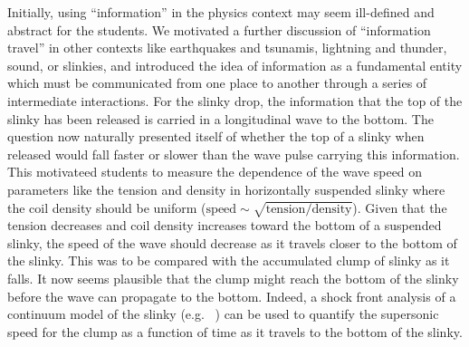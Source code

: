 \documentclass[pre,preprint,superscriptaddress,longbibliography]{revtex4-1}
\newcommand{\eq}[1]{eq.~\eqref{eq:#1}}
\begin{document}
Initially, using ``information'' in the physics context may seem ill-defined and abstract for the students.
We motivated a further discussion of ``information travel'' in other contexts like earthquakes and tsunamis, 
lightning and thunder, sound, or slinkies,
and introduced the idea of information as a fundamental entity which must be
communicated from one place to another through a series of intermediate interactions.
For the slinky drop, the information that the top of the slinky has been released is carried in a longitudinal wave to the bottom. 
The question now naturally presented itself of whether the top of a slinky when released would fall faster or slower than the wave pulse carrying this information. This motivateed students to measure the dependence of the wave speed on parameters like the tension and density in horizontally suspended slinky where the coil density should be uniform ($\mathrm{speed}\sim\sqrt{\mathrm{tension}/\mathrm{density}}$).
Given that the tension decreases and coil density increases toward the bottom of a suspended slinky, the speed of the wave should decrease  as
it travels closer to the bottom of the slinky. This was to be compared with the
accumulated clump of slinky as it falls. It now seems plausible
that the clump might reach the bottom of the slinky before the wave can propagate to the bottom. Indeed, a shock front analysis of a continuum model of the slinky (e.g. ~\cite{unruh2011}) can be used to quantify the supersonic speed for the clump as a function of time as it travels to the bottom of the slinky.
\end{document}
